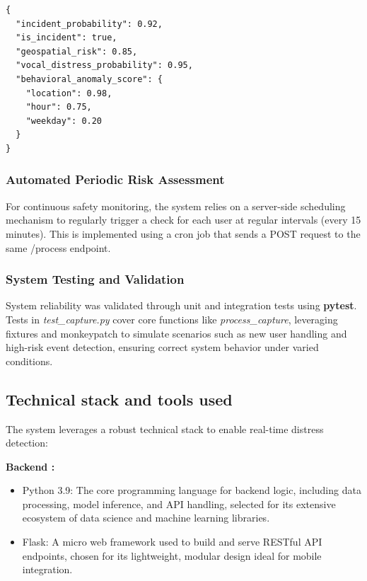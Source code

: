 \documentclass[12pt,a4paper,oneside,english]{book}
\begin{document}
\begin{lstlisting}[style=jsonstyle-compact]
{
  "incident_probability": 0.92,
  "is_incident": true,
  "geospatial_risk": 0.85,
  "vocal_distress_probability": 0.95,
  "behavioral_anomaly_score": {
    "location": 0.98,
    "hour": 0.75,
    "weekday": 0.20
  }
}
\end{lstlisting}

\subsubsection{Automated Periodic Risk Assessment}
For continuous safety monitoring, the system relies on a server-side scheduling mechanism to regularly trigger a check for each user at regular intervals (every 15 minutes).
This is implemented using a cron job that sends a POST request to the same /process endpoint.



\subsubsection{System Testing and Validation}
\label{subsec:system_testing}
System reliability was validated through unit and integration tests using \textbf{pytest}. Tests in \textit{test\_capture.py} cover core functions like \textit{process\_capture}, 
leveraging fixtures and monkeypatch to simulate scenarios such as new user handling and high-risk event detection, ensuring correct system behavior under varied conditions.


\subsection{Technical stack and tools used}
\label{technical}
The system leverages a robust technical stack to enable real-time distress detection:

\textbf{Backend :}
\begin{itemize}
    \item Python 3.9: The core programming language for backend logic, including data processing, model inference, and API handling, selected for its extensive ecosystem of data science and machine learning libraries.
    \item Flask: A micro web framework used to build and serve RESTful API endpoints, chosen for its lightweight, modular design ideal for mobile integration.
\end{itemize}
\end{document}
